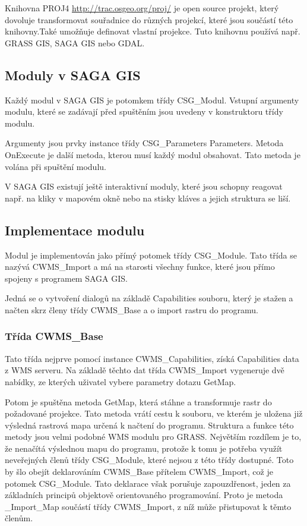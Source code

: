 \documentclass[a4paper,12pt]{article}
\begin{document}
Knihovna PROJ4 \url{http://trac.osgeo.org/proj/} je open source
projekt, který dovoluje transformovat souřadnice do různých projekcí,
které jsou součástí této knihovny.Také umožňuje definovat vlastní
projekce. Tuto knihovnu používá např. GRASS GIS, SAGA GIS nebo GDAL.

\subsection{Moduly v SAGA GIS}

Každý modul v SAGA GIS je potomkem třídy CSG\_Modul. Vstupní argumenty
modulu, které se zadávají před spuštěním jsou uvedeny v konstruktoru
třídy modulu.

Argumenty jsou prvky instance třídy CSG\_Parameters Parameters.
Metoda OnExecute je další metoda, kterou musí každý modul
obsahovat. Tato metoda je volána při spuštění modulu.

V SAGA GIS existují ještě interaktivní moduly, které jsou schopny
reagovat např. na kliky v mapovém okně nebo na stisky kláves a jejich
struktura se liší.


\subsection{Implementace modulu}
Modul je implementován jako přímý potomek třídy CSG\_Module. Tato
třída se nazývá CWMS\_Import a má na starosti všechny funkce, které
jsou přímo spojeny s programem SAGA GIS.

Jedná se o vytvoření dialogů na základě Capabilities souboru, který je
stažen a načten skrz členy třídy CWMS\_Base a o import rastru do
programu.

\subsubsection{Třída CWMS\_Base}

Tato třída nejprve pomocí instance CWMS\_Capabilities, získá
Capabilities data z WMS serveru. Na základě těchto dat třída
CWMS\_Import vygeneruje dvě nabídky, ze kterých uživatel vybere
parametry dotazu GetMap.

Potom je spuštěna metoda GetMap, která stáhne a transformuje rastr do
požadované projekce. Tato metoda vrátí cestu k souboru, ve kterém je
uložena již výsledná rastrová mapa určená k načtení do programu.
Struktura a funkce této metody jsou velmi podobné WMS modulu pro
GRASS. Největším rozdílem je to, že nenačítá výslednou mapu do
programu, protože k tomu je potřeba využít neveřejných členů třídy
CSG\_Module, které nejsou z této třídy dostupné. Toto by šlo obejít
deklarováním CWMS\_Base přítelem CWMS\_Import, což je potomek
CSG\_Module. Tato deklarace však porušuje zapouzdřenost, jeden za
základních principů objektově orientovaného programování. Proto je
metoda \_Import\_Map součástí třídy CWMS\_Import, z níž může
přistupovat k těmto členům.
\end{document}
